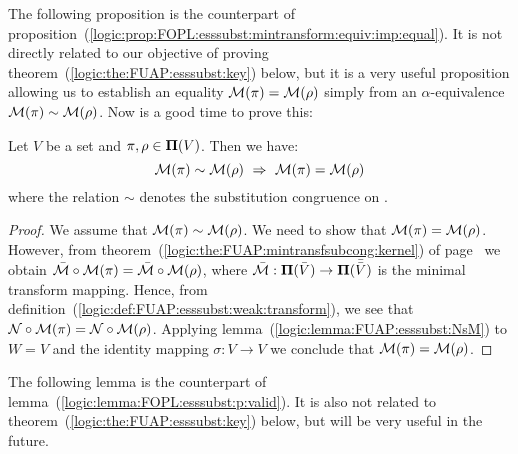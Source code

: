 The following proposition is the counterpart of
proposition~(\ref{logic:prop:FOPL:esssubst:mintransform:equiv:imp:equal}).
It is not directly related to our objective of proving
theorem~(\ref{logic:the:FUAP:esssubst:key}) below, but it is a very
useful proposition allowing us to establish an equality ${\cal
M}(\pi)={\cal M}(\rho)$ simply from an $\alpha$-equivalence ${\cal
M}(\pi)\sim{\cal M}(\rho)$. Now is a good time to prove this:

\begin{prop}\label{logic:prop:FUAP:esssubst:mintransform:equiv:imp:equal}
Let $V$ be a set and $\pi,\rho\in\mbox{${\bf\Pi}(V)$}$. Then we have:
    \[
    {\cal M}(\pi)\sim{\cal M}(\rho)\ \Rightarrow\ {\cal
    M}(\pi)={\cal M}(\rho)
    \]
where the relation $\sim$ denotes the substitution congruence on
\pvsb.
\end{prop}
\begin{proof}
We assume that ${\cal M}(\pi)\sim{\cal M}(\rho)$. We need to show
that ${\cal M}(\pi)={\cal M}(\rho)$. However, from
theorem~(\ref{logic:the:FUAP:mintransfsubcong:kernel}) of
page~\pageref{logic:the:FUAP:mintransfsubcong:kernel} we obtain
$\bar{\cal M}\circ{\cal M}(\pi)=\bar{\cal M}\circ{\cal M}(\rho)$,
where $\bar{\cal M}:\mbox{${\bf\Pi}(\bar{V})$}\to{\bf\Pi}(\bar{\bar{V}})$ is the minimal
transform mapping. Hence, from
definition~(\ref{logic:def:FUAP:esssubst:weak:transform}), we see
that ${\cal N}\circ{\cal M}(\pi)={\cal N}\circ{\cal M}(\rho)$.
Applying lemma~(\ref{logic:lemma:FUAP:esssubst:NsM}) to $W=V$ and
the identity mapping $\sigma:V\to V$ we conclude that ${\cal
M}(\pi)={\cal M}(\rho)$.
\end{proof}

The following lemma is the counterpart of
lemma~(\ref{logic:lemma:FOPL:esssubst:p:valid}). It is also not
related to theorem~(\ref{logic:the:FUAP:esssubst:key}) below, but
will be very useful in the future.

